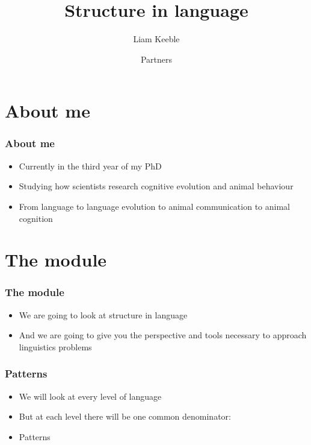 \documentclass{beamer}
\title{Structure in language}
\author{Liam Keeble}
\date{Partners}
\begin{document}
\section{About me}

\begin{frame}
\maketitle
\end{frame}

\begin{frame}
\frametitle{About me}

	\begin{itemize}
	\item Currently in the third year of my PhD
	\item Studying how scientists research cognitive evolution and animal behaviour
	\item From language to language evolution to animal communication to animal cognition
	\end{itemize}

\end{frame}

\section{The module}

\begin{frame}
\frametitle{The module}

	\begin{itemize}
	\item We are going to look at structure in language
	\item And we are going to give you the perspective and tools necessary to approach linguistics problems
	\end{itemize}
\end{frame}


\begin{frame}
	\frametitle{Patterns}
	\begin{itemize}
	\item We will look at every level of language
	\item But at each level there will be one common denominator:
	\item Patterns

	\end{itemize}

\end{frame}
\end{document}
